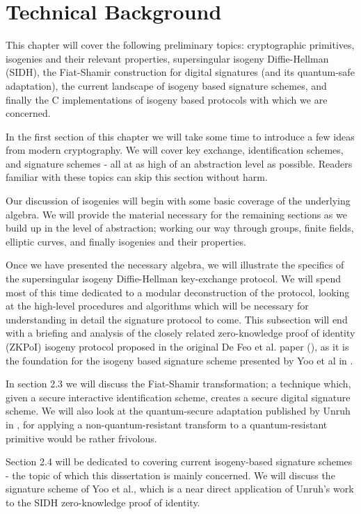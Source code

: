 \chapter{Technical Background}

This chapter will cover the following preliminary topics: cryptographic primitives, isogenies and their relevant properties, supersingular isogeny Diffie-Hellman (SIDH), the Fiat-Shamir construction for digital signatures (and its quantum-safe adaptation), the current landscape of isogeny based signature schemes, and finally the C implementations of isogeny based protocols with which we are concerned.

In the first section of this chapter we will take some time to introduce a few ideas from modern cryptography. We will cover key exchange, identification schemes, and signature schemes - all at as high of an abstraction level as possible. Readers familiar with these topics can skip this section without harm. 

Our discussion of isogenies will begin with some basic coverage of the underlying algebra. We will provide the material necessary for the remaining sections as we build up in the level of abstraction; working our way through groups, finite fields, elliptic curves, and finally isogenies and their properties.

Once we have presented the necessary algebra, we will illustrate the specifics of the supersingular isogeny Diffie-Hellman key-exchange protocol. We will spend most of this time dedicated to a modular deconstruction of the protocol, looking at the high-level procedures and algorithms which will be necessary for understanding in detail the signature protocol to come. This subsection will end with a briefing and analysis of the closely related zero-knowledge proof of identity (ZKPoI) isogeny protocol proposed in the original De Feo et al. paper (\cite{djp}), as it is the foundation for the isogeny based signature scheme presented by Yoo et al in \cite{yoo}.

In section 2.3 we will discuss the Fiat-Shamir transformation\cite{sigs}; a technique which, given a secure interactive identification scheme, creates a secure digital signature scheme. We will also look at the quantum-secure adaptation published by Unruh in \cite{unruh}, for applying a non-quantum-resistant transform to a quantum-resistant primitive would be rather frivolous.

Section 2.4 will be dedicated to covering current isogeny-based signature schemes - the topic of which this dissertation is mainly concerned. We will discuss the signature scheme of Yoo et al., which is a near direct application of Unruh's work to the SIDH zero-knowledge proof of identity.


